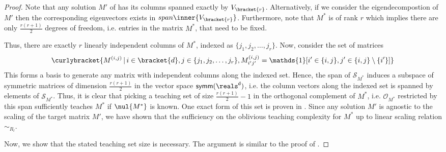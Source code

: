 \begin{proof}

    Note that any solution $M'$ of  has its columns spanned exactly by $V_{\bracket{r}}$. Alternatively, if we consider the eigendecompostion of $M'$ then the corresponding eigenvectors exists in $span \inner{V_{\bracket{r}}}$. Furthermore, note that $M^*$ is of rank $r$ which implies there are only $\frac{r(r+1)}{2}$ degrees of freedom, i.e. entries in the matrix $M^*$, that need to be fixed.

    Thus, there are exactly $r$ linearly independent columns of $M^*$, indexed as $\{j_1,j_2,\ldots, j_r\}$. Now, consider the set of matrices
    \begin{align*}
        \curlybracket{M^{(i,j)}\,|\, i \in \bracket{d}, j \in \{j_1,j_2,\ldots, j_r\}, M^{(i,j)}_{i'j'} = \mathds{1}[i'\in \{i,j\}, j' \in \{i,j\}\setminus \{i'\}]}
    \end{align*}
    This forms a basis to generate any matrix with independent columns along the indexed set. Hence, the span of $\mathcal{S}_{M^*}$ induces a subspace of symmetric matrices of dimension $\frac{r(r+1)}{2}$ in the vector space $\sf{symm}(\reals^d)$, i.e. the column vectors along the indexed set is spanned by elements of $\mathcal{S}_{M^*}$. Thus, it is clear that picking a teaching set of size $\frac{r(r+1)}{2} -1$ in the orthogonal complement of $M^*$, i.e. $\mathcal{O}_{M^*}$ restricted by this span sufficiently teaches $M^*$ if $\nul{M^*}$ is known. One exact form of this set is proven in . Since any solution $M'$ is agnostic to the scaling of the target matrix $M'$, we have shown that the sufficiency on the oblivious teaching complexity for $M^*$ up to linear scaling relation $\sim_{R_l}$.

   Now, we show that the stated teaching set size is necessary. The argument is similar to the proof of .
   

\end{proof}
